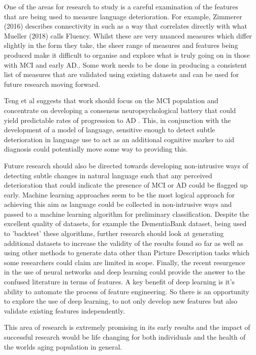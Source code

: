 \documentclass[10pt, letterpaper, twoside, openany]{thesis}
\begin{document}
One of the areas for research to study is a careful examination of the features that are being used to measure language deterioration. For example, Zimmerer (2016) \cite{Zimmerer2016} describes connectivity in such as a way that correlates directly with what Mueller (2018) \cite{Mueller2018a} calls Fluency. Whilst these are very nuanced measures which differ slightly in the form they take, the sheer range of measures and features being produced make it difficult to organise and explore what is truly going on in those with MCI and early AD.. Some work needs to be done in producing a consistent list of measures that are validated using existing datasets and can be used for future research moving forward. \newline
\par
Teng et al suggests that work should focus on the MCI population and concentrate on developing a consensus neuropsychological battery that could yield predictable rates of progression to AD \cite{Teng2009}. This, in conjunction with the development of a model of language, sensitive enough to detect subtle deterioration in language use to act as an additional cognitive marker to aid diagnosis could potentially move some way to providing this.
\par 
Future research should also be directed towards developing non-intrusive ways of detecting subtle changes in natural language such that any perceived deterioration that could indicate the presence of MCI or AD could be flagged up early. Machine learning approaches seem to be the most logical approach for achieving this aim as language could be collected in non-intrusive ways and passed to a machine learning algorithm for preliminary classification.  Despite the excellent quality of datasets, for example the DementiaBank dataset, being used to 'backtest' these algorithms, further research should look at generating additional datasets to increase the validity of the results found so far as well as using other methods to generate data other than Picture Description tasks which some researchers could claim are limited in scope. Finally, the recent resurgence in the use of neural networks and deep learning could provide the answer to the confused literature in terms of features. A key benefit of deep learning is it's ability to automate the process of feature engineering. So there is an opportunity to explore the use of deep learning, to not only develop new features but also validate existing features independently.  
\par
This area of research is extremely promising in its early results and the impact of successful research would be life changing for both individuals and the health of the worlds aging population in general.
\end{document}
